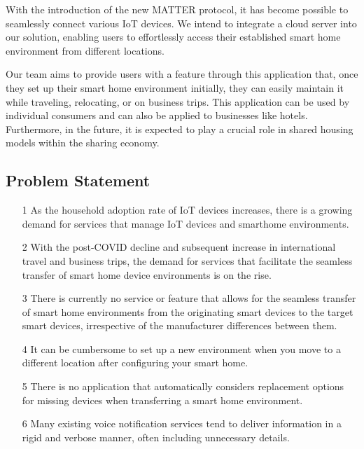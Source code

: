 \documentclass[conference]{IEEEtran}
\begin{document}
With the introduction of the new MATTER protocol, it has become possible to seamlessly connect various IoT devices. We intend to integrate a cloud server into our solution, enabling users to effortlessly access their established smart home environment from different locations.

Our team aims to provide users with a feature through this application that, once they set up their smart home environment initially, they can easily maintain it while traveling, relocating, or on business trips. This application can be used by individual consumers and can also be applied to businesses like hotels. Furthermore, in the future, it is expected to play a crucial role in shared housing models within the sharing economy.

\subsection{Problem Statement}
\begin{itemize}
\item [1] As the household adoption rate of IoT devices increases, there is a growing demand for services that manage IoT devices and smarthome environments. \\
\item [2] With the post-COVID decline and subsequent increase in international travel and business trips, the demand for services that facilitate the seamless transfer of smart home device environments is on the rise.\\
\item [3] There is currently no service or feature that allows for the seamless transfer of smart home environments from the originating smart devices to the target smart devices, irrespective of the manufacturer differences between them.
\\
\item [4] It can be cumbersome to set up a new environment when you move to a different location after configuring your smart home.
\\
\item [5] There is no application that automatically considers replacement options for missing devices when transferring a smart home environment.
\\\item [6] Many existing voice notification services tend to deliver information in a rigid and verbose manner, often including unnecessary details.
\end{itemize}
\end{document}
